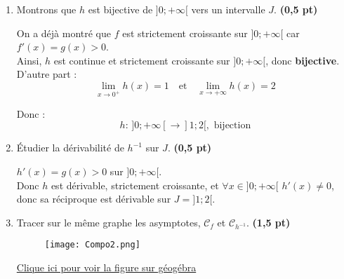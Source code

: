 \documentclass[12pt,a4paper]{article}
\begin{document}
\begin{enumerate}
\section*{Partie C : \textbf{2,5 pts}}

Soit \( h \) la restriction de \( f \) à l’intervalle \( ]0 ; +\infty[ \) :
\[
h(x) = x \ln\left( \dfrac{x+1}{x} \right) + 1
\]

    \item Montrons que \( h \) est bijective de \( ]0 ; +\infty[ \) vers un intervalle \( J \). \hfill \textbf{(0,5 pt)}

    On a déjà montré que \( f \) est strictement croissante sur \( ]0 ; +\infty[ \) car \( f'(x) = g(x) > 0 \).\\
    Ainsi, \( h \) est continue et strictement croissante sur \( ]0 ; +\infty[ \), donc \textbf{bijective}.\\

    D'autre part :
    \[
    \lim_{x \to 0^+} h(x) = 1 \quad \text{et} \quad \lim_{x \to +\infty} h(x) = 2
    \]

    Donc :
    \[
    \boxed{h : \, ]0 ; +\infty[ \to ]1 ; 2[, \text{ bijection}}
    \]

    \item Étudier la dérivabilité de \( h^{-1} \) sur \( J \). \hfill \textbf{(0,5 pt)}

    \( h'(x) = g(x) > 0 \) sur \(]0 ; +\infty[\).\\
    Donc \( h \) est dérivable, strictement croissante, et \( \forall x \in ]0 ; +\infty[\) \( h'(x) \ne 0 \), donc sa réciproque est dérivable sur \( J = ]1 ; 2[ \).\\


    \item Tracer sur le même graphe les asymptotes, \( \mathcal{C}_f \) et \( \mathcal{C}_{h^{-1}} \). \hfill \textbf{(1,5 pt)}

	    \begin{center}
        \begin{figure}[H]%
         \centering
         \texttt{[image: Compo2.png]}
        \end{figure}
    \end{center}
        \href{https://www.geogebra.org/classic/kgbuagda}{Clique ici pour voir la figure sur géogébra}
\end{enumerate}
    
\end{document}
